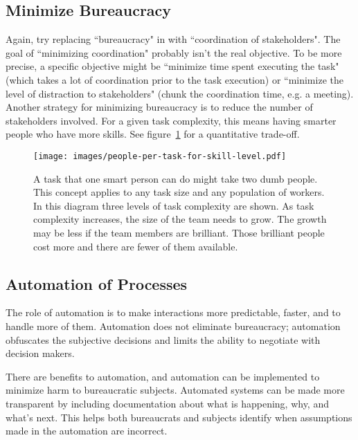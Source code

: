 \subsection*{Minimize Bureaucracy}
Again, try replacing ``bureaucracy" in with ``coordination of stakeholders". The goal of ``minimizing coordination" probably isn't the real objective. To be more precise, a specific objective might be ``minimize time spent executing the task" (which takes a lot of coordination prior to the task execution) or ``minimize the level of distraction to stakeholders" (chunk the coordination time, e.g. a meeting). Another strategy for minimizing bureaucracy is to reduce the number of stakeholders involved. For a given task complexity, this means having smarter people who have more skills. See figure~\ref{fig:complexity-and-size} for a quantitative trade-off. 


\begin{figure}
\texttt{[image: images/people-per-task-for-skill-level.pdf]}
\caption{A task that one smart person can do might take two dumb people. This concept applies to any task size and any population of workers. In this diagram three levels of task complexity are shown. As task complexity increases, the size of the team needs to grow. The growth may be less if the team members are brilliant. Those brilliant people cost more and there are fewer of them available.}
\label{fig:complexity-and-size}
\end{figure}


\subsection*{Automation of Processes\label{sec:automation}}

The role of automation is to make interactions more predictable, faster, and to handle more of them. Automation does not eliminate bureaucracy; automation obfuscates the subjective decisions and limits the ability to negotiate with decision makers.

There are benefits to automation, and automation can be implemented to minimize harm to bureaucratic subjects.  Automated systems can be made more transparent by including documentation about what is happening, why, and what's next.
This helps both bureaucrats and subjects identify when assumptions made in the automation are incorrect. 


